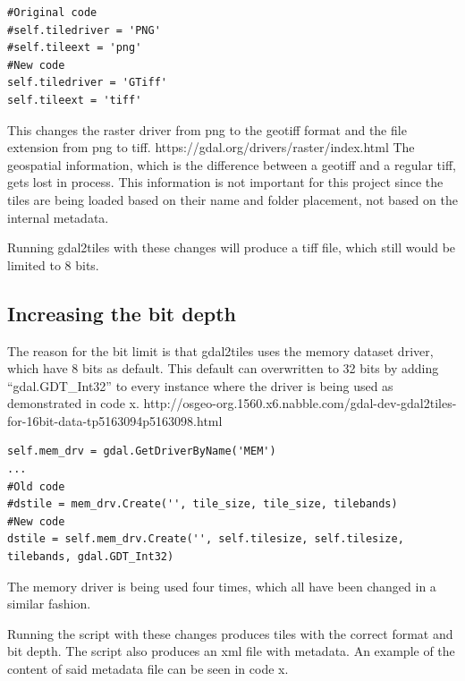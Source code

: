 \begin{lstlisting}[language=iPython, caption={Changing the file format}, label= VoresPY,escapechar=|]
#Original code
#self.tiledriver = 'PNG'
#self.tileext = 'png'
#New code
self.tiledriver = 'GTiff'
self.tileext = 'tiff'
\end{lstlisting}
This changes the raster driver from png to the geotiff format and the file extension from png to tiff. 
https://gdal.org/drivers/raster/index.html
The geospatial information, which is the difference between a geotiff and a regular tiff, gets lost in process. This information is not important for this project since the tiles are being loaded based on their name and folder placement, not based on the internal metadata.

Running gdal2tiles with these changes will produce a tiff file, which still would be limited to 8 bits. 
\subsection{Increasing the bit depth}
The reason for the bit limit is that gdal2tiles uses the memory dataset driver, which have 8 bits as default.  This default can overwritten to 32 bits by adding “gdal.GDT\_Int32” to every instance where the driver is being used as demonstrated in code x. 
http://osgeo-org.1560.x6.nabble.com/gdal-dev-gdal2tiles-for-16bit-data-tp5163094p5163098.html

\begin{lstlisting}[language=iPython, caption={Increasing the bit depth}, label= VoresPY,escapechar=|]
self.mem_drv = gdal.GetDriverByName('MEM')
...
#Old code
#dstile = mem_drv.Create('', tile_size, tile_size, tilebands)
#New code
dstile = self.mem_drv.Create('', self.tilesize, self.tilesize, tilebands, gdal.GDT_Int32)
\end{lstlisting}
The memory driver is being used four times, which all have been changed in a similar fashion.

Running the script with these changes produces tiles with the correct format and bit depth. The script also produces an xml file with metadata. An example of the content of said metadata file can be seen in code x.

